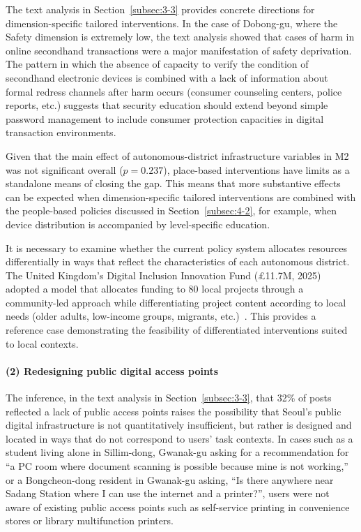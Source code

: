 The text analysis in Section~\ref{subsec:3-3} provides concrete directions for dimension-specific tailored interventions. In the case of Dobong-gu, where the Safety dimension is extremely low, the text analysis showed that cases of harm in online secondhand transactions were a major manifestation of safety deprivation. The pattern in which the absence of capacity to verify the condition of secondhand electronic devices is combined with a lack of information about formal redress channels after harm occurs (consumer counseling centers, police reports, etc.) suggests that security education should extend beyond simple password management to include consumer protection capacities in digital transaction environments.

Given that the main effect of autonomous-district infrastructure variables in M2 was not significant overall ($p = 0.237$), place-based interventions have limits as a standalone means of closing the gap. This means that more substantive effects can be expected when dimension-specific tailored interventions are combined with the people-based policies discussed in Section~\ref{subsec:4-2}, for example, when device distribution is accompanied by level-specific education.

It is necessary to examine whether the current policy system allocates resources differentially in ways that reflect the characteristics of each autonomous district. The United Kingdom's Digital Inclusion Innovation Fund (£11.7M, 2025) adopted a model that allocates funding to 80 local projects through a community-led approach while differentiating project content according to local needs (older adults, low-income groups, migrants, etc.)~\citep{UKDSIT2025}. This provides a reference case demonstrating the feasibility of differentiated interventions suited to local contexts.

\paragraph{(2) Redesigning public digital access points}

The inference, in the text analysis in Section~\ref{subsec:3-3}, that 32\% of posts reflected a lack of public access points raises the possibility that Seoul's public digital infrastructure is not quantitatively insufficient, but rather is designed and located in ways that do not correspond to users' task contexts. In cases such as a student living alone in Sillim-dong, Gwanak-gu asking for a recommendation for ``a PC room where document scanning is possible because mine is not working,'' or a Bongcheon-dong resident in Gwanak-gu asking, ``Is there anywhere near Sadang Station where I can use the internet and a printer?'', users were not aware of existing public access points such as self-service printing in convenience stores or library multifunction printers.

